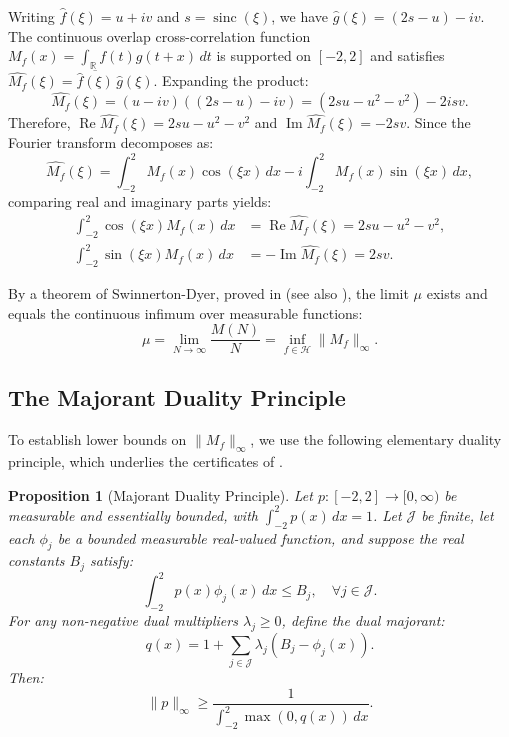 \documentclass[11pt,a4paper]{article}
\newtheorem{proposition}[theorem]{Proposition}
\theoremstyle{definition}
\theoremstyle{remark}
\newcommand{\R}{\mathbb{R}}
\begin{document}
Writing $\widehat{f}(\xi) = u + iv$ and $s = \operatorname{sinc}(\xi)$, we have $\widehat{g}(\xi) = (2s - u) - iv$. The continuous overlap cross-correlation function $M_f(x) = \int_{\R} f(t)g(t+x) \, dt$ is supported on $[-2, 2]$ and satisfies $\widehat{M_f}(\xi) = \overline{\widehat{f}(\xi)} \, \widehat{g}(\xi)$. Expanding the product:
\begin{equation}
\widehat{M_f}(\xi) = (u - iv)((2s - u) - iv) = (2su - u^2 - v^2) - 2i s v.
\end{equation}
Therefore, $\operatorname{Re}\widehat{M_f}(\xi) = 2su - u^2 - v^2$ and $\operatorname{Im}\widehat{M_f}(\xi) = -2sv$. 
Since the Fourier transform decomposes as:
\begin{equation}
\widehat{M_f}(\xi) = \int_{-2}^2 M_f(x) \cos(\xi x) \, dx - i \int_{-2}^2 M_f(x) \sin(\xi x) \, dx,
\end{equation}
comparing real and imaginary parts yields:
\begin{align}
\int_{-2}^2 \cos(\xi x) M_f(x) \, dx &= \operatorname{Re}\widehat{M_f}(\xi) = 2su - u^2 - v^2, \\
\int_{-2}^2 \sin(\xi x) M_f(x) \, dx &= -\operatorname{Im}\widehat{M_f}(\xi) = 2sv.
\end{align}

By a theorem of Swinnerton-Dyer, proved in \cite{haugland1996} (see also \cite{white2022}), the limit $\mu$ exists and equals the continuous infimum over measurable functions:
\begin{equation}
\label{eq:sd}
\mu = \lim_{N \to \infty} \frac{M(N)}{N} = \inf_{f \in \mathcal{H}} \|M_f\|_\infty.
\end{equation}

\subsection{The Majorant Duality Principle}

To establish lower bounds on $\|M_f\|_\infty$, we use the following elementary duality principle, which underlies the certificates of \cite{price2026, deng2026}.
\begin{proposition}[Majorant Duality Principle]
\label{thm:majorant_duality}
Let $p: [-2,2] \to [0,\infty)$ be measurable and essentially bounded, with $\int_{-2}^2 p(x)\,dx=1$. Let $\mathcal{J}$ be finite, let each $\phi_j$ be a bounded measurable real-valued function, and suppose the real constants $B_j$ satisfy:
\begin{equation}
\int_{-2}^2 p(x) \phi_j(x) \, dx \le B_j, \quad \forall j \in \mathcal{J}.
\end{equation}
For any non-negative dual multipliers $\lambda_j \ge 0$, define the dual majorant:
\begin{equation}
q(x) = 1 + \sum_{j \in \mathcal{J}} \lambda_j (B_j - \phi_j(x)).
\end{equation}
Then:
\begin{equation}
\|p\|_\infty \ge \frac{1}{\int_{-2}^2 \max(0, q(x)) \, dx}.
\end{equation}
\end{proposition}
\end{document}
